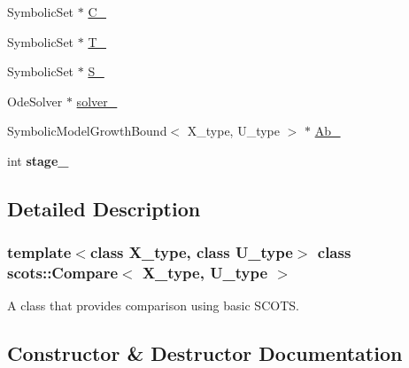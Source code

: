 \begin{DoxyCompactItemize}
\item 
Symbolic\+Set $\ast$ \hyperlink{classscots_1_1Compare_a1ffd2853abc9ab09cfb8983b3664ab1b}{C\+\_\+}
\item 
Symbolic\+Set $\ast$ \hyperlink{classscots_1_1Compare_aeb0830d94286ae12672cf1ea183afb1d}{T\+\_\+}
\item 
Symbolic\+Set $\ast$ \hyperlink{classscots_1_1Compare_a2512f264f83a21365693bbd506b9e7a2}{S\+\_\+}
\item 
Ode\+Solver $\ast$ \hyperlink{classscots_1_1Compare_aa42864e8794631891d01f0367e1db277}{solver\+\_\+}
\item 
Symbolic\+Model\+Growth\+Bound$<$ X\+\_\+type, U\+\_\+type $>$ $\ast$ \hyperlink{classscots_1_1Compare_a0ec2c4c168dc46f79616a393c1cda103}{Ab\+\_\+}
\item 
\mbox{\label{classscots_1_1Compare_ae036e8066fed2391f333c8f64282f12e}} 
int {\bfseries stage\+\_\+}
\end{DoxyCompactItemize}


\subsection{Detailed Description}
\subsubsection*{template$<$class X\+\_\+type, class U\+\_\+type$>$\newline
class scots\+::\+Compare$<$ X\+\_\+type, U\+\_\+type $>$}

A class that provides comparison using basic S\+C\+O\+TS. 

\subsection{Constructor \& Destructor Documentation}
\mbox{\label{classscots_1_1Compare_a06f6c44e21931f635f157d213b1834ba}} 
